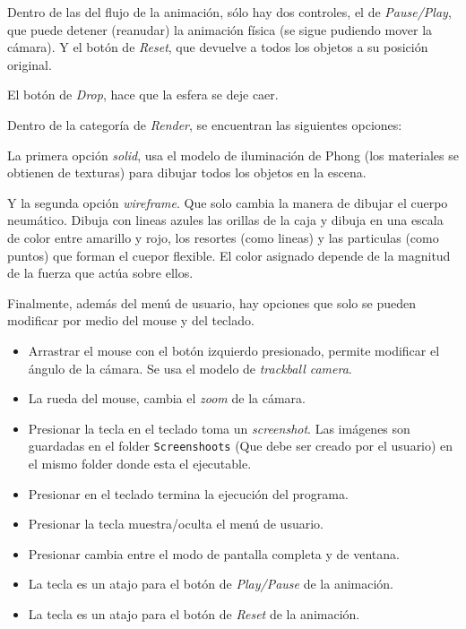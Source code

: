 Dentro de las del flujo de la animación, sólo hay dos controles, el de \emph{\textenglish{Pause/Play}}, que puede detener (reanudar) la animación física (se sigue pudiendo mover la cámara).
Y el botón de \emph{\textenglish{Reset}}, que devuelve a todos los objetos a su posición original.

El botón de \emph{\textenglish{Drop}}, hace que la esfera se deje caer.

Dentro de la categoría de \emph{\textenglish{Render}}, se encuentran las siguientes opciones:

La primera opción \emph{\textenglish{solid}}, usa el modelo de iluminación de Phong (los materiales se obtienen de texturas) para dibujar todos los objetos en la escena.

Y la segunda opción \emph{\textenglish{wireframe}}. 
Que solo cambia la manera de dibujar el cuerpo neumático.
Dibuja con lineas azules las orillas de la caja y dibuja en una escala de color entre amarillo y rojo, los resortes (como lineas) y las particulas (como puntos) que forman el cuepor flexible.
El color asignado depende de la magnitud de la fuerza que actúa sobre ellos.

Finalmente, además del menú de usuario, hay opciones que solo se pueden modificar por medio del \textenglish{mouse} y del teclado.

\begin{itemize}
 \item Arrastrar el mouse con el botón izquierdo presionado, permite modificar el ángulo de la cámara. Se usa el modelo de \emph{\textenglish{trackball camera}}.
 \item La rueda del mouse, cambia el \emph{\textenglish{zoom}} de la cámara.
 \item Presionar la tecla  en el teclado toma un \emph{\textenglish{screenshot}}. Las imágenes son guardadas en el folder \texttt{Screenshoots} (Que debe ser creado por el usuario) en el mismo folder donde esta el ejecutable.
 \item Presionar  en el teclado termina la ejecución del programa.
 \item Presionar la tecla  muestra/oculta el menú de usuario.
 \item Presionar  cambia entre el modo de pantalla completa y de ventana.
 \item La tecla  es un atajo para el botón de \emph{\textenglish{Play/Pause}} de la animación.
 \item La tecla  es un atajo para el botón de \emph{\textenglish{Reset}} de la animación.
\end{itemize}

